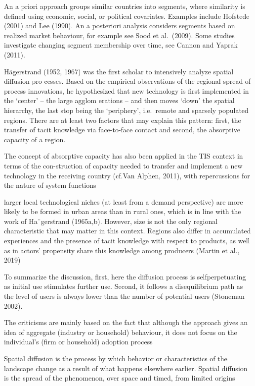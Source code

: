 \documentclass[preprint, 3p,
authoryear]{elsarticle} %
\begin{document}
An a priori approach groups similar countries into segments, where
similarity is defined using economic, social, or political covariates.
Examples include Hofstede (2001) and Lee (1990). An a posteriori
analysis considers segments based on realized market behaviour, for
example see Sood et al.~(2009). Some studies investigate changing
segment membership over time, see Cannon and Yaprak (2011).

\citet{fritsch2015new} Hägerstrand (1952, 1967) was the first scholar to
intensively analyze spatial diffusion pro cesses. Based on the empirical
observations of the regional spread of process innovations, he
hypothesized that new technology is first implemented in the `center' --
the large agglom erations -- and then moves `down' the spatial
hierarchy, the last stop being the `periphery', i.e.~remote and sparsely
populated regions. There are at least two factors that may explain this
pattern: first, the transfer of tacit knowledge via face-to-face contact
and second, the absorptive capacity of a region.

\citet{bento2015spatial} The concept of absorptive capacity has also
been applied in the TIS context in terms of the con-struction of
capacity needed to transfer and implement a new technology in the
receiving country (cf.Van Alphen, 2011), with repercussions for the
nature of system functions

\citet{bednarz2020pulled} larger local technological niches (at least
from a demand perspective) are more likely to be formed in urban areas
than in rural ones, which is in line with the work of Ha¨gerstrand
(1965a,b). However, size is not the only regional characteristic that
may matter in this context. Regions also differ in accumulated
experiences and the presence of tacit knowledge with respect to
products, as well as in actors' propensity share this knowledge among
producers (Martin et al., 2019)

To summarize the discussion, first, here the diffusion process is
selfperpetuating as initial use stimulates further use. Second, it
follows a disequilibrium path as the level of users is always lower than
the number of potential users (Stoneman 2002).

The criticisms are mainly based on the fact that although the approach
gives an idea of aggregate (industry or household) behaviour, it does
not focus on the individual's (firm or household) adoption process

\citet{morrill2020spatial} Spatial diffusion is the process by which
behavior or characteristics of the landscape change as a result of what
happens elsewhere earlier. Spatial diffusion is the spread of the
phenomenon, over space and timed, from limited origins
\end{document}
